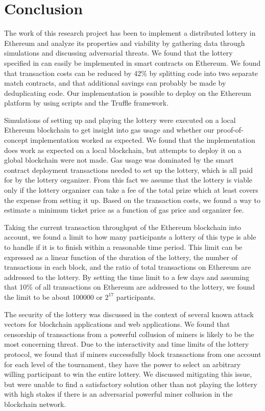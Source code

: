 \chapter{Conclusion}
\label{chap:conclusion}


The work of this research project has been to implement a distributed lottery in Ethereum and analyze its properties and viability by gathering data through simulations and discussing adversarial threats. We found that the lottery specified in \cite{miller_zero-collateral_2017} can easily be implemented in smart contracts on Ethereum. We found that transaction costs can be reduced by 42\% by splitting code into two separate match contracts, and that additional savings can probably be made by deduplicating code. Our implementation is possible to deploy on the Ethereum platform by using scripts and the Truffle framework.

Simulations of setting up and playing the lottery were executed on a local Ethereum blockchain to get insight into gas usage and whether our proof-of-concept implementation worked as expected. We found that the implementation does work as expected on a local blockchain, but attempts to deploy it on a global blockchain were not made. Gas usage was dominated by the smart contract deployment transactions needed to set up the lottery, which is all paid for by the lottery organizer. From this fact we assume that the lottery is viable only if the lottery organizer can take a fee of the total prize which at least covers the expense from setting it up. Based on the transaction costs, we found a way to estimate a minimum ticket price as a function of gas price and organizer fee.

Taking the current transaction throughput of the Ethereum blockchain into account, we found a limit to how many participants a lottery of this type is able to handle if it is to finish within a reasonable time period. This limit can be expressed as a linear function of the duration of the lottery, the number of transactions in each block, and the ratio of total transactions on Ethereum are addressed to the lottery. By setting the time limit to a few days and assuming that 10\% of all transactions on Ethereum are addressed to the lottery, we found the limit to be about 100000 or $2^{17}$ participants.

The security of the lottery was discussed in the context of several known attack vectors for blockchain applications and web applications. We found that censorship of transactions from a powerful collusion of miners is likely to be the most concerning threat. Due to the interactivity and time limits of the lottery protocol, we found that if miners successfully block transactions from one account for each level of the tournament, they have the power to select an arbitrary willing participant to win the entire lottery.
We discussed mitigating this issue, but were unable to find a satisfactory solution other than not playing the lottery with high stakes if there is an adversarial powerful miner collusion in the blockchain network. 

